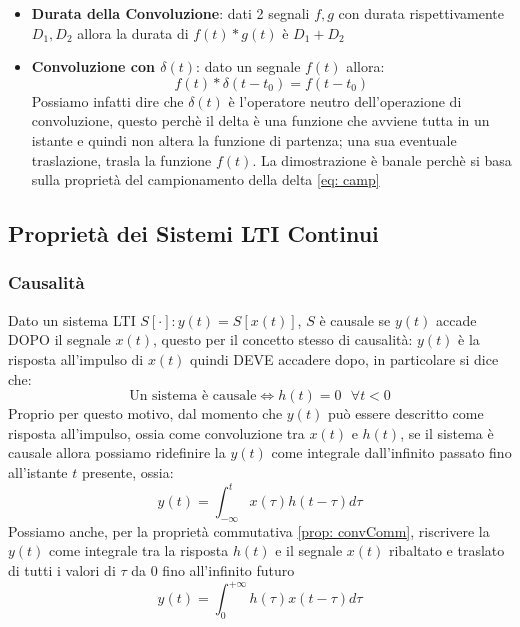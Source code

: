 \begin{itemize}
    \item \textbf{Durata della Convoluzione}: \label{prop: ConvDurata} dati 2 segnali $f,g$ con durata rispettivamente $D_1,D_2$ allora la durata di $f(t) \ast g(t)$ è $D_1 + D_2$
    
    \item \textbf{Convoluzione con $\delta(t)$}: \label{prop: ConvDelta} dato un segnale $f(t)$ allora:
    \begin{equation}
        f(t) \ast \delta(t - t_0) = f(t - t_0)
    \end{equation}
    Possiamo infatti dire che $\delta(t)$ è l'operatore neutro dell'operazione di convoluzione, questo perchè il delta è una funzione che avviene tutta in un istante e quindi non altera la funzione di partenza; una sua eventuale traslazione, trasla la funzione $f(t)$.
    La dimostrazione è banale perchè si basa sulla proprietà del campionamento della delta \eqref{eq: camp}
\end{itemize}


\newpage

\subsection{Proprietà dei Sistemi LTI Continui}
\subsubsection{Causalità} \label{prop: causalita}
Dato un sistema LTI $S[\cdot] : y(t) = S[x(t)]$, $S$ è causale se $y(t)$ accade DOPO il segnale $x(t)$, questo per il concetto stesso di causalità:
$y(t)$ è la risposta all'impulso di $x(t)$ quindi DEVE accadere dopo, in particolare si dice che:\\
\begin{equation}
    \mbox{Un sistema è causale} \Longleftrightarrow h(t) = 0 \mbox{  } \forall t < 0
\end{equation}
Proprio per questo motivo, dal momento che $y(t)$ può essere descritto come risposta all'impulso, ossia come convoluzione tra $x(t)$ e $h(t)$, se 
il sistema è causale allora possiamo ridefinire la $y(t)$ come integrale dall'infinito passato fino all'istante $t$ presente, ossia:
\begin{equation}
    y(t) = \int_{-\infty}^{t} x(\tau) h(t - \tau) d\tau
\end{equation}
Possiamo anche, per la proprietà commutativa \eqref{prop: convComm}, riscrivere la $y(t)$ come integrale tra la risposta $h(t)$ e il segnale $x(t)$ ribaltato e traslato
di tutti i valori di $\tau$ da 0 fino all'infinito futuro
\begin{equation}
    y(t) = \int_{0}^{+\infty} h(\tau)x(t - \tau) d\tau
\end{equation}

